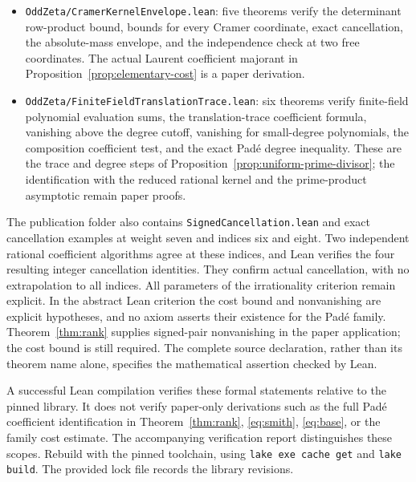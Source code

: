 \documentclass[11pt]{article}
\theoremstyle{remark}
\begin{document}
\begin{itemize}
the dual determinant and adjugate identities, positivity, and soundness
of an arbitrary unimodular reduction certificate. These are the algebraic
and discrete minimum steps of Proposition~\ref{prop:binary-minimum}.
The realization as an abstract Euclidean lattice and the family rate
in \eqref{eq:binary-rate} are not asserted by these modules.
\item \texttt{OddZeta/CramerKernelEnvelope.lean}:
five theorems verify the determinant row-product bound, bounds for every
Cramer coordinate, exact cancellation, the absolute-mass envelope, and
the independence check at two free coordinates. The actual Laurent
coefficient majorant in Proposition~\ref{prop:elementary-cost} is a
paper derivation.
\item \texttt{OddZeta/FiniteFieldTranslationTrace.lean}:
six theorems verify finite-field polynomial evaluation sums, the
translation-trace coefficient formula, vanishing above the degree cutoff,
vanishing for small-degree polynomials, the composition coefficient
test, and the exact Pad\'e degree inequality. These are the trace and
degree steps of Proposition~\ref{prop:uniform-prime-divisor}; the
identification with the reduced rational kernel and the prime-product
asymptotic remain paper proofs.
\end{itemize}
The publication folder also contains \texttt{SignedCancellation.lean}
and exact cancellation examples at weight seven and indices six and eight.
Two independent rational coefficient algorithms agree at these indices,
and Lean verifies the four resulting integer cancellation identities.
They confirm actual cancellation, with no extrapolation to all indices.
All parameters of the irrationality criterion remain explicit.
In the abstract Lean criterion the cost bound and nonvanishing are
explicit hypotheses, and no axiom asserts their existence for the Pad\'e
family. Theorem~\ref{thm:rank} supplies signed-pair nonvanishing in the
paper application; the cost bound is still required.
The complete source declaration, rather than its theorem name alone,
specifies the mathematical assertion checked by Lean.

A successful Lean compilation verifies these formal statements relative
to the pinned library. It does not verify paper-only derivations such
as the full Pad\'e coefficient identification in Theorem~\ref{thm:rank},
\eqref{eq:smith}, \eqref{eq:base}, or the family cost estimate.
The accompanying verification report distinguishes these scopes.
Rebuild with the pinned toolchain, using
\texttt{lake exe cache get} and \texttt{lake build}.
The provided lock file records the library revisions.
\end{document}

